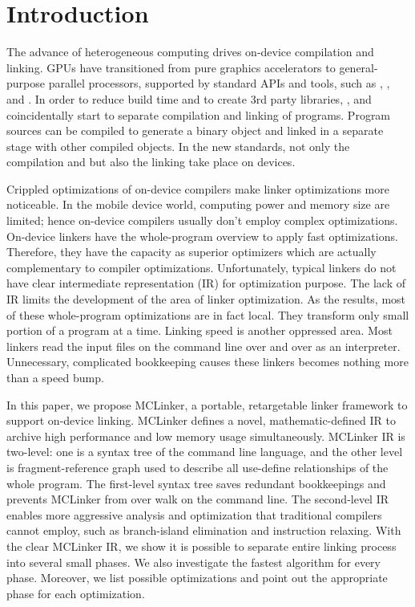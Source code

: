 \section{Introduction}
The advance of heterogeneous computing drives on-device compilation and linking. GPUs have transitioned from pure graphics accelerators to general-purpose parallel processors, supported by standard APIs and tools, such as \cite{CUDA}, \cite{OpenCL}, \cite{DirectCompute} and \cite{HSA}. In order to reduce build time and to create 3rd party libraries, \cite{CUDA}, \cite{OpenCL} and \cite{HSA} coincidentally start to separate compilation and linking of programs. Program sources can be compiled to generate a binary object and linked in a separate stage with other compiled objects. In the new standards, not only the compilation and but also the linking take place on devices.

Crippled optimizations of on-device compilers make linker optimizations more noticeable. In the mobile device world, computing power and memory size are limited; hence on-device compilers usually don't employ complex optimizations. On-device linkers have the whole-program overview to apply fast optimizations. Therefore, they have the capacity as superior optimizers which are actually complementary to compiler optimizations. Unfortunately, typical linkers do not have clear intermediate representation (IR) for optimization purpose. The lack of IR limits the development of the area of linker optimization. As the results, most of these whole-program optimizations are in fact local. They transform only small portion of a program at a time. Linking speed is another oppressed area. Most linkers read the input files on the command line over and over as an interpreter. Unnecessary, complicated bookkeeping causes these linkers becomes nothing more than a speed bump.

In this paper, we propose MCLinker, a portable, retargetable linker framework to support on-device linking. MCLinker defines a novel, mathematic-defined IR to archive high performance and low memory usage simultaneously. MCLinker IR is two-level: one is a syntax tree of the command line language, and the other level is fragment-reference graph used to describe all use-define relationships of the whole program. The first-level syntax tree saves redundant bookkeepings and prevents MCLinker from over walk on the command line. The second-level IR enables more aggressive analysis and optimization that traditional compilers cannot employ, such as branch-island elimination and instruction relaxing. With the clear MCLinker IR, we show it is possible to separate entire linking process into several small phases. We also investigate the fastest algorithm for every phase. Moreover, we list possible optimizations and point out the appropriate phase for each optimization.

